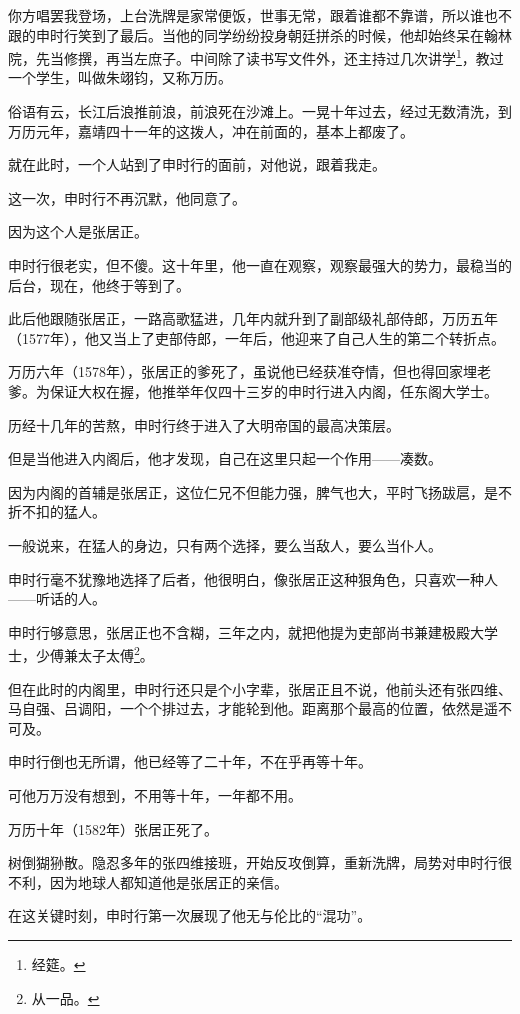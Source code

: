 \begin{multicols}{\theparacolNo}
你方唱罢我登场，上台洗牌是家常便饭，世事无常，跟着谁都不靠谱，所以谁也不跟的申时行笑到了最后。当他的同学纷纷投身朝廷拼杀的时候，他却始终呆在翰林院，先当修撰，再当左庶子。中间除了读书写文件外，还主持过几次讲学\footnote{经筵。}，教过一个学生，叫做朱翊钧，又称万历。

俗语有云，长江后浪推前浪，前浪死在沙滩上。一晃十年过去，经过无数清洗，到万历元年，嘉靖四十一年的这拨人，冲在前面的，基本上都废了。

就在此时，一个人站到了申时行的面前，对他说，跟着我走。

这一次，申时行不再沉默，他同意了。

因为这个人是张居正。

申时行很老实，但不傻。这十年里，他一直在观察，观察最强大的势力，最稳当的后台，现在，他终于等到了。

此后他跟随张居正，一路高歌猛进，几年内就升到了副部级礼部侍郎，万历五年（1577年），他又当上了吏部侍郎，一年后，他迎来了自己人生的第二个转折点。

万历六年（1578年），张居正的爹死了，虽说他已经获准夺情，但也得回家埋老爹。为保证大权在握，他推举年仅四十三岁的申时行进入内阁，任东阁大学士。

历经十几年的苦熬，申时行终于进入了大明帝国的最高决策层。

但是当他进入内阁后，他才发现，自己在这里只起一个作用——凑数。

因为内阁的首辅是张居正，这位仁兄不但能力强，脾气也大，平时飞扬跋扈，是不折不扣的猛人。

一般说来，在猛人的身边，只有两个选择，要么当敌人，要么当仆人。

申时行毫不犹豫地选择了后者，他很明白，像张居正这种狠角色，只喜欢一种人——听话的人。

申时行够意思，张居正也不含糊，三年之内，就把他提为吏部尚书兼建极殿大学士，少傅兼太子太傅\footnote{从一品。}。

但在此时的内阁里，申时行还只是个小字辈，张居正且不说，他前头还有张四维、马自强、吕调阳，一个个排过去，才能轮到他。距离那个最高的位置，依然是遥不可及。

申时行倒也无所谓，他已经等了二十年，不在乎再等十年。

可他万万没有想到，不用等十年，一年都不用。

万历十年（1582年）张居正死了。

树倒猢狲散。隐忍多年的张四维接班，开始反攻倒算，重新洗牌，局势对申时行很不利，因为地球人都知道他是张居正的亲信。

在这关键时刻，申时行第一次展现了他无与伦比的“混功”。


\end{multicols}
